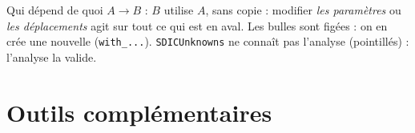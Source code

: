 \documentclass[aspectratio=169,11pt]{beamer}
\newcommand{\cls}[1]{\textcolor{pyblue}{\texttt{#1}}}
\begin{document}
\begin{frame}{Qui dépend de quoi}
  \medskip
  \small
  $A \to B$ : $B$ \alert{utilise} $A$, sans copie : modifier \textcolor{pyred}{\textit{les
  paramètres}} ou \textcolor{pyred}{\textit{les déplacements}} agit sur tout ce qui est
  \alert{en aval}. Les bulles sont figées : on en crée une nouvelle (\texttt{with\_...}).
  \cls{SDICUnknowns} ne connaît pas l'analyse (pointillés) : l'analyse la valide.
\end{frame}

\section{Outils complémentaires}
 
\end{document}
